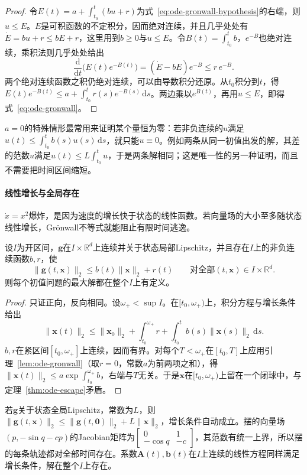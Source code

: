\begin{proof}
  令$E(t)=a+\int_{t_0}^t(bu+r)$为式~\eqref{eq:ode-gronwall-hypothesis}的右端，则$u\leq E$。$E$是可积函数的不定积分，因而绝对连续，并且几乎处处有$\dot E=bu+r\leq bE+r$，这里用到$b\geq0$与$u\leq E$。令$B(t)=\int_{t_0}^tb$，$e^{-B}$也绝对连续，乘积法则几乎处处给出
  \[
    \frac{\mathrm d}{\mathrm dt}\bigl(E(t)e^{-B(t)}\bigr)=(\dot E-bE)e^{-B}\leq r\,e^{-B}.
  \]
  两个绝对连续函数之积仍绝对连续，可以由导数积分还原。从$t_0$积分到$t$，得$E(t)e^{-B(t)}\leq a+\int_{t_0}^tr(s)e^{-B(s)}\,\mathrm ds$。两边乘以$e^{B(t)}$，再用$u\leq E$，即得式~\eqref{eq:ode-gronwall}。
\end{proof}

$a=0$的特殊情形最常用来证明某个量恒为零：若非负连续的$u$满足$u(t)\leq\int_{t_0}^tb(s)u(s)\,\mathrm ds$，就只能$u\equiv0$。例如两条从同一初值出发的解，其差的范数$u$满足$u(t)\leq L\int_{t_0}^tu$，于是两条解相同；这是唯一性的另一种证明，而且不需要把时间区间缩短。

\paragraph{线性增长与全局存在}
$\dot x=x^2$爆炸，是因为速度的增长快于状态的线性函数。若向量场的大小至多随状态线性增长，Grönwall不等式就能阻止有限时间逃逸。

\begin{theorem}[线性增长下的全局存在]
  \label{thm:ode-global-existence}
  设$I$为开区间，$\bm g$在$I\times\mathbb R^d$上连续并关于状态局部Lipschitz，并且存在$I$上的非负连续函数$b,r$，使
  \[
    \|\bm g(t,\bm x)\|_2\leq b(t)\|\bm x\|_2+r(t)\qquad\text{对全部}(t,\bm x)\in I\times\mathbb R^d.
  \]
  则每个初值问题的最大解都在整个$I$上有定义。
\end{theorem}

\begin{proof}
  只证正向，反向相同。设$\omega_+<\sup I$。在$[t_0,\omega_+)$上，积分方程与增长条件给出
  \[
    \|\bm x(t)\|_2\leq\|\bm x_0\|_2+\int_{t_0}^{\omega_+}r+\int_{t_0}^tb(s)\|\bm x(s)\|_2\,\mathrm ds.
  \]
  $b,r$在紧区间$[t_0,\omega_+]$上连续，因而有界。对每个$T<\omega_+$在$[t_0,T]$上应用引理~\ref{lem:ode-gronwall}（取$r=0$，常数$a$为前两项之和），得$\|\bm x(t)\|_2\leq a\exp\int_{t_0}^{\omega_+}b$，右端与$T$无关。于是$\bm x$在$[t_0,\omega_+)$上留在一个闭球中，与定理~\ref{thm:ode-escape}矛盾。
\end{proof}

若$\bm g$关于状态全局Lipschitz，常数为$L$，则$\|\bm g(t,\bm x)\|_2\leq\|\bm g(t,\bm0)\|_2+L\|\bm x\|_2$，增长条件自动成立。摆的向量场$(p,-\sin q-cp)$的Jacobian矩阵为$\begin{bmatrix}0&1\\-\cos q&-c\end{bmatrix}$，其范数有统一上界，所以摆的每条轨迹都对全部时间存在。系数$\bm A(t),\bm b(t)$在$I$上连续的线性方程同样满足增长条件，解在整个$I$上存在。

